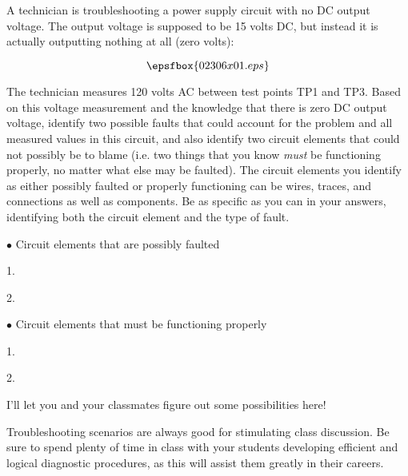 

A technician is troubleshooting a power supply circuit with no DC output voltage.  The output voltage is supposed to be 15 volts DC, but instead it is actually outputting nothing at all (zero volts):

$$\epsfbox{02306x01.eps}$$

The technician measures 120 volts AC between test points TP1 and TP3.  Based on this voltage measurement and the knowledge that there is zero DC output voltage, identify two possible faults that could account for the problem and all measured values in this circuit, and also identify two circuit elements that could not possibly be to blame (i.e. two things that you know {\it must} be functioning properly, no matter what else may be faulted).  The circuit elements you identify as either possibly faulted or properly functioning can be wires, traces, and connections as well as components.  Be as specific as you can in your answers, identifying both the circuit element and the type of fault.

\medskip
\goodbreak
\item{$\bullet$} Circuit elements that are possibly faulted
\item{1.} 
\item{2.} 
\medskip

\medskip
\goodbreak
\item{$\bullet$} Circuit elements that must be functioning properly
\item{1.} 
\item{2.} 
\medskip








I'll let you and your classmates figure out some possibilities here!







Troubleshooting scenarios are always good for stimulating class discussion.  Be sure to spend plenty of time in class with your students developing efficient and logical diagnostic procedures, as this will assist them greatly in their careers.




